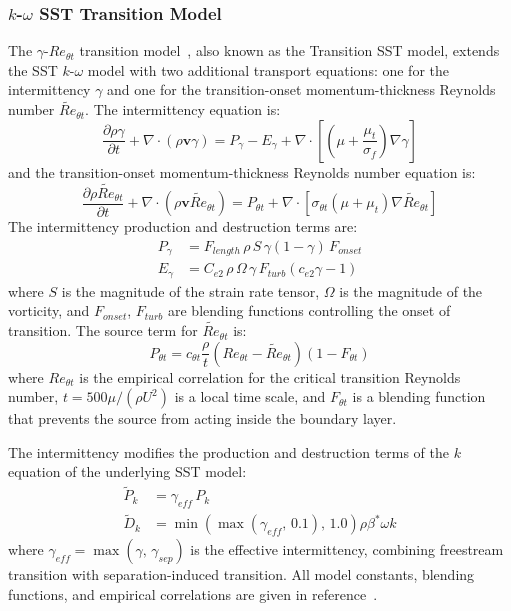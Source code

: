 \documentclass[12pt]{extarticle}
\newcommand{\<}{\langle}
\renewcommand{\>}{\rangle}
\theoremstyle{definition}
\begin{document}
\subsubsection{$k$-$\omega$ SST Transition Model}

The $\gamma$-$Re_{\theta t}$ transition model~\cite{menter2006correlation}, also known as the Transition SST model, extends the SST $k$-$\omega$ model with two additional transport equations: one for the intermittency $\gamma$ and one for the transition-onset momentum-thickness Reynolds number $\widetilde{Re}_{\theta t}$. The intermittency equation is:
\begin{equation}
\frac{\partial \rho \gamma}{\partial t} + \nabla\cdot(\rho\textbf{v}\gamma) = P_\gamma - E_\gamma + \nabla\cdot\left[\left(\mu+\frac{\mu_t}{\sigma_f}\right)\nabla\gamma\right]
\end{equation}
and the transition-onset momentum-thickness Reynolds number equation is:
\begin{equation}
\frac{\partial \rho\widetilde{Re}_{\theta t}}{\partial t} + \nabla\cdot(\rho\textbf{v}\widetilde{Re}_{\theta t}) = P_{\theta t} + \nabla\cdot\left[\sigma_{\theta t}\left(\mu+\mu_t\right)\nabla\widetilde{Re}_{\theta t}\right]
\end{equation}
The intermittency production and destruction terms are:
\begin{align}
    P_\gamma &= F_{length}\,\rho\,S\,\gamma(1-\gamma)\,F_{onset} \\
    E_\gamma &= C_{e2}\,\rho\,\Omega\,\gamma\,F_{turb}(c_{e2}\gamma-1)
\end{align}
where $S$ is the magnitude of the strain rate tensor, $\Omega$ is the magnitude of the vorticity, and $F_{onset}$, $F_{turb}$ are blending functions controlling the onset of transition. The source term for $\widetilde{Re}_{\theta t}$ is:
\begin{equation}
    P_{\theta t} = c_{\theta t}\frac{\rho}{t}\left(Re_{\theta t}-\widetilde{Re}_{\theta t}\right)(1-F_{\theta t})
\end{equation}
where $Re_{\theta t}$ is the empirical correlation for the critical transition Reynolds number, $t = 500\mu/(\rho U^2)$ is a local time scale, and $F_{\theta t}$ is a blending function that prevents the source from acting inside the boundary layer.

The intermittency modifies the production and destruction terms of the $k$ equation of the underlying SST model:
\begin{align}
    \widetilde{P}_k &= \gamma_{eff}\, P_k \\
    \widetilde{D}_k &= \min\!\left(\max(\gamma_{eff},\,0.1),\,1.0\right)\rho\beta^*\omega k
\end{align}
where $\gamma_{eff} = \max(\gamma,\,\gamma_{sep})$ is the effective intermittency, combining freestream transition with separation-induced transition. All model constants, blending functions, and empirical correlations are given in reference~\cite{menter2006correlation}.
\end{document}
